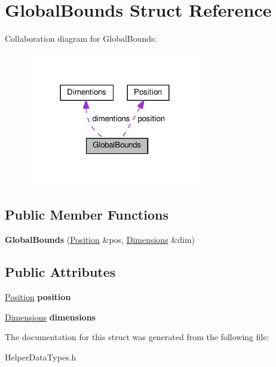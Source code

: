 \hypertarget{structGlobalBounds}{}\section{Global\+Bounds Struct Reference}
\label{structGlobalBounds}


Collaboration diagram for Global\+Bounds\+:
\nopagebreak
\begin{figure}[H]
\begin{center}
\leavevmode
\includegraphics[width=216pt]{structGlobalBounds__coll__graph}
\end{center}
\end{figure}
\subsection*{Public Member Functions}
\begin{DoxyCompactItemize}
\item 
\mbox{\label{structGlobalBounds_a38d87fc7f3c34bff62bd744ac9fc3724}} 
{\bfseries Global\+Bounds} (\hyperlink{structPosition}{Position} \&pos, \hyperlink{structDimentions}{Dimensions} \&dim)
\end{DoxyCompactItemize}
\subsection*{Public Attributes}
\begin{DoxyCompactItemize}
\item 
\mbox{\label{structGlobalBounds_a6224bede2eff12cec85b6999b7faedc3}} 
\hyperlink{structPosition}{Position} {\bfseries position}
\item 
\mbox{\label{structGlobalBounds_a1fb273eb005424a1d6ff34d3808c7081}} 
\hyperlink{structDimentions}{Dimensions} {\bfseries dimensions}
\end{DoxyCompactItemize}


The documentation for this struct was generated from the following file\+:\begin{DoxyCompactItemize}
\item 
Helper\+Data\+Types.\+h\end{DoxyCompactItemize}
